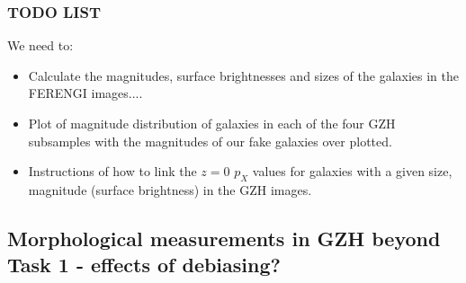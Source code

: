 \documentclass[usenatbib]{mn2e}
\begin{document}
%
%
%
%
%
%
%


\subsubsection{TODO LIST}
We need to: 
\begin{itemize}
\item Calculate the magnitudes, surface brightnesses and sizes of the galaxies in the FERENGI images....
\item Plot of magnitude distribution of galaxies in each of the four GZH subsamples with the magnitudes of our fake galaxies over plotted. 
\item Instructions of how to link the $z=0$ $p_X$ values for galaxies with a given size, magnitude (surface brightness) in the GZH images. 
\end{itemize}

\subsection{Morphological measurements in GZH beyond Task 1 - effects of debiasing?}
\end{document}

